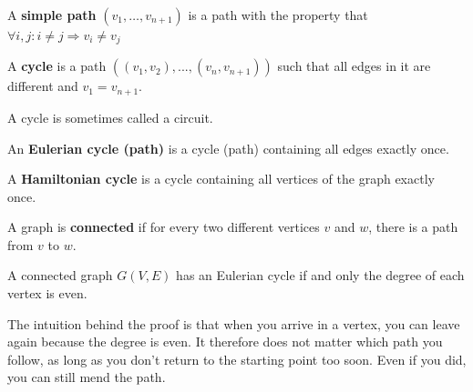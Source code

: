 \begin{definition}
  \textup{A \textbf{simple path} $(v_{1}, \ldots , v_{n+1})$ is a path
  with the property that $\forall i,j: i \neq j \Rightarrow v_{i} \neq v_{j}$ }
\end{definition}



\begin{definition}[Cycle]
  \textup{A \textbf{cycle} is a path
    $((v_1,v_2),...,(v_n,v_{n+1}))$ such that all edges in it are
different and $v_{1} = v_{n+1}$.}
\end{definition}

A cycle is sometimes called a circuit.


\begin{definition}
  \textup{An \textbf{Eulerian cycle (path)} is a cycle (path)
containing all edges exactly once.}
\end{definition}

\begin{definition}
  \textup{ A \textbf{Hamiltonian cycle} is a cycle containing all
vertices of the graph exactly once.}
\end{definition}


\begin{definition}
  \textup{ A graph is \textbf{connected} if for every two different
vertices $v$ and $w$, there is a path from $v$ to $w$.}
\end{definition}

\newpage

\begin{theorem}
A connected graph $G(V,E)$ has an Eulerian cycle if and only the degree of
each vertex is even.
\end{theorem}
The intuition behind the proof is that when you arrive in a vertex,
you can leave again because the degree is even. It therefore does not
matter which path you follow, as long as you don't return to the
starting point too soon. Even if you did, you can still mend the path.

